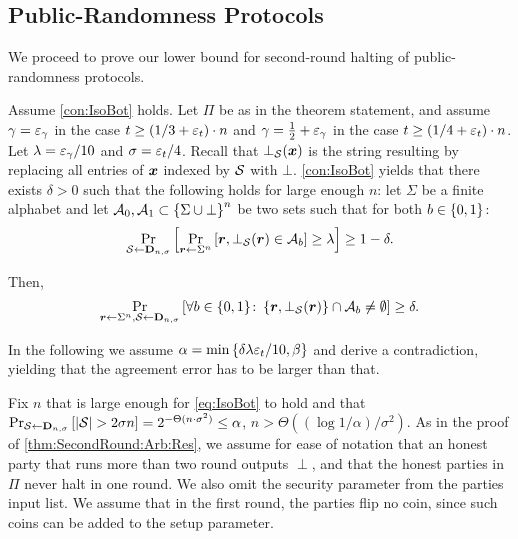 \subsection{Public-Randomness Protocols}\label{sec:TwoRoundProtcol:PR}
We proceed to prove our lower bound for second-round halting of public-randomness protocols.

\begin{theorem} \label{thm:SecondRound:PR:Res}
	\ThmSeconRoundPR
\end{theorem}

Assume \cref{con:IsoBot} holds. Let $\Pi$ be as in the theorem statement, and assume $\gamma= \varepsilon_\gamma$ in the case $t \ge (1/3 +\varepsilon_t)\cdot n$ and $\gamma= \tfrac{1}{2} + \varepsilon_\gamma$ in the case $t \ge (1/4 +\varepsilon_t)\cdot n$. Let $\lambda =\varepsilon_\gamma /10$ and $\sigma= \varepsilon_t/4$. Recall that $\bot_{\mathcal{S}}({ \boldsymbol{x}})$ is the string resulting by replacing all entries of ${ \boldsymbol{x}}$ indexed by $\mathcal{S}$ with $\bot$.
\cref{con:IsoBot} yields that there exists $\delta>0$ such that the following holds for large enough $n$: let $\Sigma$ be a finite alphabet and let $\mathcal{A}_0,\mathcal{A}_1 \subset \left\{\Sigma \cup \bot\right\}^n$ be two sets such that for both $b\in \{0,1\}$:
\begin{align*}
\Pr_{{\cal{S}}\gets \mathbf{D}_{n,\sigma}}\left[\Pr_{{ \boldsymbol{r}} \gets \Sigma^n}\left[{ \boldsymbol{r}},\bot_{\mathcal{S}}({ \boldsymbol{r}}) \in \mathcal{A}_b\right] \ge \lambda\right] \ge 1-\delta.
\end{align*}

Then,
\begin{align}\label{eq:IsoBot}
\Pr_{{ \boldsymbol{r}}\gets \Sigma^n,\mathcal{S} \gets \mathbf{D}_{n,\sigma}}\left[\forall b\in \{0,1\}\colon \left\{{ \boldsymbol{r}},\bot_{\mathcal{S}}({ \boldsymbol{r}})\right\} \cap \mathcal{A}_b \neq \emptyset\right] \ge \delta.
\end{align}


In the following we assume $\alpha = \min\left\{\delta\lambda \varepsilon_t/10, \beta\right\}$ and derive a contradiction, yielding that the agreement error has to be larger than that.


Fix $n$ that is large enough for \cref{eq:IsoBot} to hold and that $\Pr_{{\cal{S}} \gets \mathbf{D}_{n,\sigma}}\left[\left|{\cal{S}}\right| > 2\sigma n\right] = 2^{- \Theta(n\cdot \sigma^2)} \le \alpha$, \ie $n> \Theta((\log 1/\alpha)/\sigma^2)$. As in the proof of \cref{thm:SecondRound:Arb:Res}, we assume for ease of notation that an honest party that runs more than two round outputs $\perp$, and that the honest parties in $\Pi$ never halt in one round. We also omit the security parameter from the parties input list. We assume \wlg that in the first round, the parties flip
no coin, since such coins can be added to the setup parameter.

